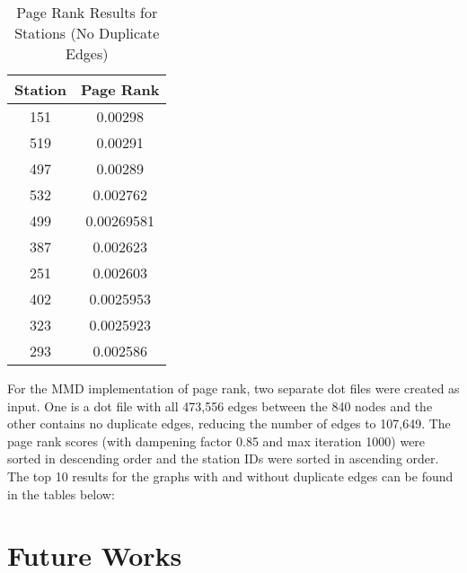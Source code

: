 \documentclass{article}
\begin{document}
 \begin{table}[h!]
\caption{Page Rank Results for Stations (No Duplicate Edges)}
\centering
 \begin{tabular}{||c c||} 
 \hline
 Station & Page Rank \\ [0.5ex] 
 \hline\hline
 151 & 0.00298\\ 
 519 & 0.00291\\
 497 & 0.00289\\ 
 532 & 0.002762\\
 499 & 0.00269581\\
 387 & 0.002623\\
 251 & 0.002603\\
 402 & 0.0025953\\
 323 & 0.0025923\\
 293 & 0.002586\\[1ex] 
 \hline
 \end{tabular}
 \end{table}
For the MMD implementation of page rank, two separate dot files were created as input. One is a dot file with all 473,556 edges between the 840 nodes and the other contains no duplicate edges, reducing the number of edges to 107,649. The page rank scores (with dampening factor 0.85 and max iteration 1000) were sorted in descending order and the station IDs were sorted in ascending order. The top 10 results for the graphs with and without duplicate edges can be found in the tables below: 
\section{Future Works}
\end{document}
